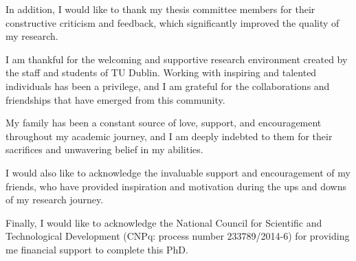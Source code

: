 In addition, I would like to thank my thesis committee members for their constructive criticism and feedback, which significantly improved the quality of my research.

I am thankful for the welcoming and supportive research environment created by the staff and students of TU Dublin. Working with inspiring and talented individuals has been a privilege, and I am grateful for the collaborations and friendships that have emerged from this community.

My family has been a constant source of love, support, and encouragement throughout my academic journey, and I am deeply indebted to them for their sacrifices and unwavering belief in my abilities.

I would also like to acknowledge the invaluable support and encouragement of my friends, who have provided inspiration and motivation during the ups and downs of my research journey.

Finally, I would like to acknowledge the National Council for Scientific and Technological Development (CNPq: process number 233789/2014-6) for providing me financial support to complete this PhD.

